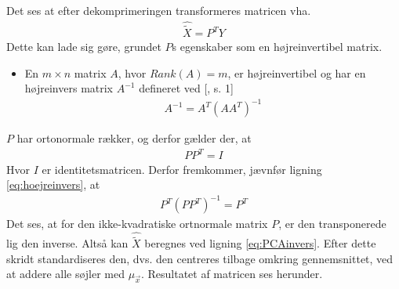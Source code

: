 Det ses at efter dekomprimeringen transformeres matricen vha.
\begin{align}
\hat{\tilde{X}} = P^T Y
\label{eq:PCAinvers}
\end{align}
Dette kan lade sig gøre, grundet $P$s egenskaber som en højreinvertibel matrix.
\begin{itemize}
\item[]{En $m \times n$ matrix $A$, hvor $Rank(A)=m$, er højreinvertibel og har en højreinvers matrix $A^{-1}$ defineret ved [\citet{leftinverse}, s. 1]
\begin{align}
A^{-1}=A^T(AA^T)^{-1}
\label{eq:hoejreinvers}
\end{align} 
}
\end{itemize}
$P$ har ortonormale rækker, og derfor gælder der, at
\begin{align}
PP^T=I
\end{align}
Hvor $I$ er identitetsmatricen. Derfor fremkommer, jævnfør ligning \ref{eq:hoejreinvers}, at
\begin{align}
P^T(PP^T)^{-1}=P^T
\end{align}
Det ses, at for den ikke-kvadratiske ortnormale matrix $P$, er den transponerede lig den inverse. Altså kan $\hat{\tilde{X}}$ beregnes ved ligning \ref{eq:PCAinvers}.
Efter dette skridt standardiseres den, dvs. den centreres tilbage omkring gennemsnittet, ved at addere alle søjler med $\mu_{\vec{x}}$. Resultatet af matricen ses herunder.

